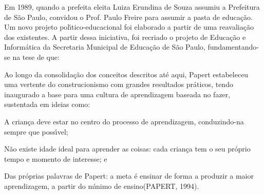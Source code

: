 \documentclass[
12pt,		%
openright,	%
twoside,  %
a4paper,			%
chapter=TITLE,		%
english,			%
french,				%
spanish,			%
brazil				%
]{USPSC-classe/USPSC}
\begin{document}
Em 1989, quando a prefeita eleita Luiza Erundina de Souza assumiu a Prefeitura de S\~ao Paulo, convidou o Prof. Paulo Freire para assumir a pasta de educa\c{c}\~ao. Um novo projeto pol\'{\i}tico-educacional foi elaborado a partir de uma reavalia\c{c}\~ao dos existentes. A partir dessa iniciativa, foi recriado o projeto de Educa\c{c}\~ao e Inform\'atica da Secretaria Municipal de Educa\c{c}\~ao de S\~ao Paulo, fundamentando-se na tese de que:









\noindent\begin{center}\mbox{\centering{}}\end{center}


Ao longo da consolida\c{c}\~ao dos conceitos descritos at\'e aqui, Papert estabeleceu uma vertente do construcionismo com grandes resultados pr\'aticos, tendo inaugurado a base para uma cultura de aprendizagem baseada no \textquotedbl fazer\textquotedbl , sustentada em ideias como:









\begin{alineas}
\item A crian\c{c}a deve estar no centro do processo de aprendizagem, conduzindo-na sempre que poss\'{\i}vel;
\item N\~ao existe idade ideal para aprender as coisas: cada crian\c{c}a tem o seu pr\'oprio tempo e momento de interesse; e
\item Das pr\'oprias palavras de Papert: \textquotedbl a meta \'e ensinar de forma a produzir a maior aprendizagem, a partir do m\'{\i}nimo de ensino\textquotedbl   (PAPERT, 1994).
\end{alineas}
\end{document}
